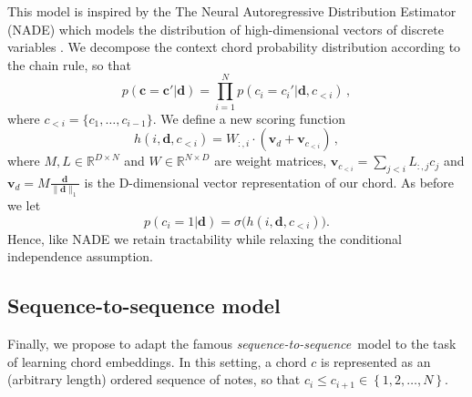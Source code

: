 \documentclass{article}
\newcommand{\R}{\mathbb{R}}
\newcommand{\boldc}{\boldsymbol c}
\newcommand{\boldd}{\boldsymbol d}
\newcommand{\boldvd}{\boldsymbol v_d}
\newcommand{\boldvci}{\boldsymbol v_{c_{<i}}}
\newcommand{\seqtoseq}{\textit{sequence-to-sequence}}
\begin{document}
This model is inspired by the The Neural Autoregressive Distribution Estimator (NADE) which models the distribution of high-dimensional vectors of discrete variables \citep{larochelle2011}. We decompose the context chord probability distribution according to the chain rule, so that
%
\begin{equation}
p(\boldc =\boldc' | \boldd) = \prod_{i=1}^N  p(c_i =c_i'|  \boldd, c_{<i}) \,,
\end{equation} 
%
where $c_{<i} = \{c_1, \ldots, c_{i-1}\}$. We define a new scoring function
%
\begin{equation}
h(i,\boldd,c_{<i}) =  W_{:,i} \cdot (\boldvd + \boldvci) \,,
\end{equation}
%
where $M, L \in \R^{D \times N}$ and $W\in \R^{N \times D}$ are weight matrices, $\boldvci=\sum_{j<i}  L_{:,j} c_j$ and $\boldvd = M\frac{ \boldd}{\| \boldd \|_1}$ is the D-dimensional vector representation of our chord.
As before we let
%
\begin{equation}
p(c_i =1|\boldd) = \sigma\big( h(i,\boldd,c_{<i}) \big).
\end{equation}
Hence, like NADE we retain tractability while relaxing the conditional independence assumption.
%
\subsection{Sequence-to-sequence model}
%
Finally, we propose to adapt the famous \seqtoseq\ model \citep{SutskeverVL14} to the task of learning chord embeddings. In this setting, a chord $c$ is represented as an (arbitrary length) ordered sequence of notes, so that $c_i\leq c_{i+1}\in\left\{1,2,\dots,N\right\}$.
\end{document}
